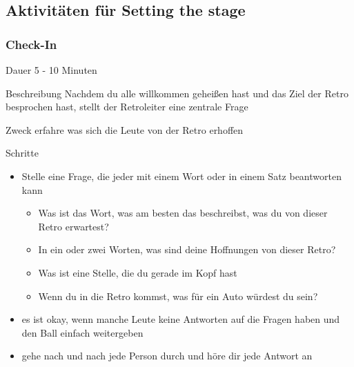 \subsection{Aktivitäten für Setting the stage}

\subsubsection{Check-In}
\begin{Beschreibungfett}[Beschreibung]
  \item [Dauer] 5 - 10 Minuten
  \item [Beschreibung] Nachdem du alle willkommen geheißen hast und das Ziel der Retro besprochen hast, stellt der Retroleiter eine zentrale Frage
  \item [Zweck] erfahre was sich die Leute von der Retro erhoffen
  \item [Schritte]
    \begin{itemize}
      \item Stelle eine Frage, die jeder mit einem Wort oder in einem Satz beantworten kann
        \begin{itemize}
          \item Was ist das Wort, was am besten das beschreibst, was du von dieser Retro
            erwartest?
          \item In ein oder zwei Worten, was sind deine Hoffnungen von dieser Retro?
          \item Was ist eine Stelle, die du gerade im Kopf hast
          \item Wenn du in die Retro kommst, was für ein Auto würdest du sein?
        \end{itemize}
      \item es ist okay, wenn manche Leute keine Antworten auf die Fragen haben und den Ball
        einfach weitergeben
      \item gehe nach und nach jede Person durch und höre dir jede Antwort an
    \end{itemize}
\end{Beschreibungfett}


